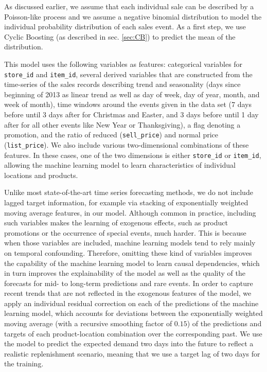\documentclass[BCOR=1mm, DIV=calc,10pt,
twoside=true,
twocolumn,
headings=normal]{scrartcl}
\begin{document}
As discussed earlier, we assume that each individual sale can be described by a Poisson-like process and we assume a negative binomial distribution to model the individual probability distribution of each sales event. As a first step, we use Cyclic Boosting (as described in sec. \ref{sec:CB}) to predict the mean of the distribution.

\noindent
This model uses the following variables as features: categorical variables for \texttt{store\_id} and \texttt{item\_id}, several derived variables that are constructed from the time-series of the sales records describing trend and seasonality (days since beginning of 2013 as linear trend as well as day of week, day of year, month, and week of month), time windows around the events given in the data set (7 days before until 3 days after for Christmas and Easter, and 3 days before until 1 day after for all other events like New Year or Thanksgiving), a flag denoting a promotion, and the ratio of reduced (\texttt{sell\_price}) and normal price (\texttt{list\_price}). We also include various two-dimensional combinations of these features. In these cases, one of the two dimensions is either \texttt{store\_id} or \texttt{item\_id}, allowing the machine learning model to learn characteristics of individual locations and products.

Unlike most state-of-the-art time series forecasting methods, we do not include lagged target information, for example via stacking of exponentially weighted moving average features, in our model. Although common in practice, including such variables makes the learning of exogenous effects, such as product promotions or the occurrence of special events, much harder. This is because when those variables are included, machine learning models tend to rely mainly on temporal confounding. Therefore, omitting these kind of variables improves the capability of the machine learning model to learn causal dependencies, which in turn improves the explainability of the model as well as the quality of the forecasts for mid- to long-term predictions and rare events. In order to capture recent trends that are not reflected in the exogenous features of the model, we apply an individual residual correction on each of the predictions of the machine learning model, which accounts for deviations between the exponentially weighted moving average (with a recursive smoothing factor of $0.15$) of the predictions and targets of each product-location combination over the corresponding past. We use the model to predict the expected demand two days into the future to reflect a realistic replenishment scenario, meaning that we use a target lag of two days for the training.
\end{document}
